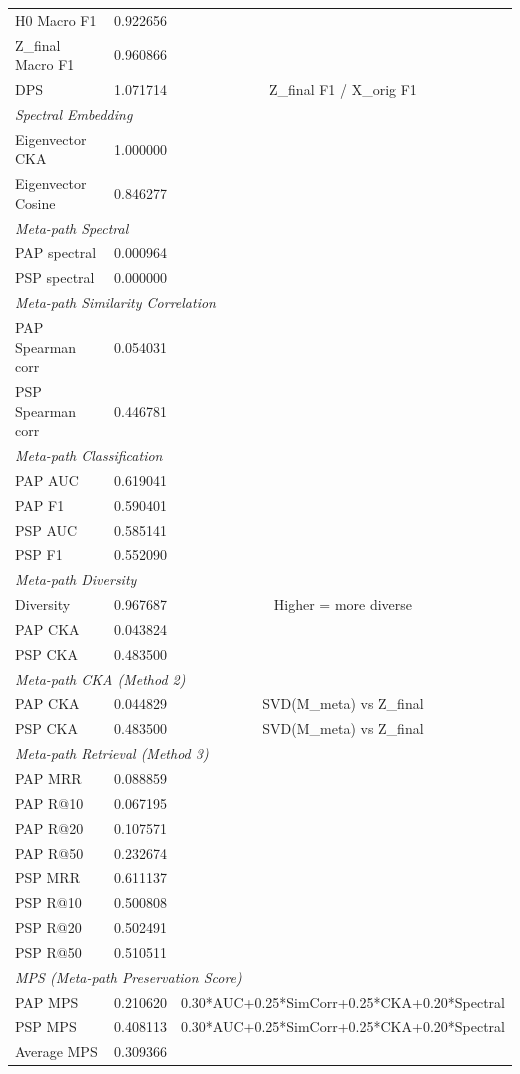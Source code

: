 \begin{landscape}
\begin{table}[h]
\begin{tabular}{lcc}
H0 Macro F1 & 0.922656 &  \\
Z_final Macro F1 & 0.960866 &  \\
DPS & 1.071714 & Z_final F1 / X_orig F1 \\
\midrule
\multicolumn{3}{l}{\textit{Spectral Embedding}} \\
Eigenvector CKA & 1.000000 &  \\
Eigenvector Cosine & 0.846277 &  \\
\midrule
\multicolumn{3}{l}{\textit{Meta-path Spectral}} \\
PAP spectral & 0.000964 &  \\
PSP spectral & 0.000000 &  \\
\midrule
\multicolumn{3}{l}{\textit{Meta-path Similarity Correlation}} \\
PAP Spearman corr & 0.054031 &  \\
PSP Spearman corr & 0.446781 &  \\
\midrule
\multicolumn{3}{l}{\textit{Meta-path Classification}} \\
PAP AUC & 0.619041 &  \\
PAP F1 & 0.590401 &  \\
PSP AUC & 0.585141 &  \\
PSP F1 & 0.552090 &  \\
\midrule
\multicolumn{3}{l}{\textit{Meta-path Diversity}} \\
Diversity & 0.967687 & Higher = more diverse \\
PAP CKA & 0.043824 &  \\
PSP CKA & 0.483500 &  \\
\midrule
\multicolumn{3}{l}{\textit{Meta-path CKA (Method 2)}} \\
PAP CKA & 0.044829 & SVD(M_meta) vs Z_final \\
PSP CKA & 0.483500 & SVD(M_meta) vs Z_final \\
\midrule
\multicolumn{3}{l}{\textit{Meta-path Retrieval (Method 3)}} \\
PAP MRR & 0.088859 &  \\
PAP R@10 & 0.067195 &  \\
PAP R@20 & 0.107571 &  \\
PAP R@50 & 0.232674 &  \\
PSP MRR & 0.611137 &  \\
PSP R@10 & 0.500808 &  \\
PSP R@20 & 0.502491 &  \\
PSP R@50 & 0.510511 &  \\
\midrule
\multicolumn{3}{l}{\textit{MPS (Meta-path Preservation Score)}} \\
PAP MPS & 0.210620 & 0.30*AUC+0.25*SimCorr+0.25*CKA+0.20*Spectral \\
PSP MPS & 0.408113 & 0.30*AUC+0.25*SimCorr+0.25*CKA+0.20*Spectral \\
Average MPS & 0.309366 &  \\
\bottomrule
\end{tabular}
\end{table}
\end{landscape}